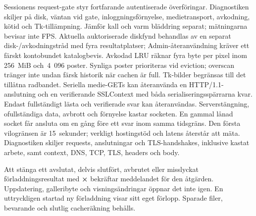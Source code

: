 \documentclass[11pt,a4paper]{article}
\newcommand{\ui}[1]{\textbf{#1}}
\begin{document}
Sessionens request-gate styr fortfarande autentiserade
överföringar. Diagnostiken skiljer på disk, väntan vid gate,
inloggningsförnyelse, medietransport, avkodning, kötid och Tk-tillämpning.
Jämför kall och varm bläddring separat; mätningarna bevisar inte FPS.
Aktuella auktoriserade diskfynd behandlas av en separat disk-/avkodningstråd med
fyra resultatplatser; Admin-återanvändning kräver ett färskt kontobundet
katalogbevis.
Avkodad LRU räknar fyra byte per pixel inom 256~MiB och~4~096 poster. Synliga
poster prioriteras vid eviction; overscan tränger inte undan färsk historik
när cachen är full. Tk-bilder begränsas till det tillåtna radbandet.
Seriella medie-GETs kan återanvända en HTTP/1.1-anslutning och en verifierande
SSLContext med båda serialiseringsspärrarna kvar. Endast fullständigt lästa
och verifierade svar kan återanvändas. Serverstängning, ofullständiga data,
avbrott och förnyelse kastar socketen. En gammal lånad socket får ansluta om
en gång före ett svar inom samma tidsgräns. Den första vilogränsen är
15~sekunder; verkligt hostingstöd och latens återstår att mäta.
Diagnostiken skiljer requests, anslutningar och TLS-handshakes, inklusive
kastat arbete, samt context, DNS, TCP, TLS, headers och body.

Att stänga ett avslutat, delvis slutfört, avbrutet eller misslyckat
förladdningsresultat med
\ui{×} bekräftar meddelandet för den åtgärden. Uppdatering, galleribyte och
visningsändringar öppnar det inte igen. En uttryckligen startad ny förladdning
visar sitt eget förlopp. Sparade filer, bevarande och slutlig cacheräkning
behålls.
\end{document}
